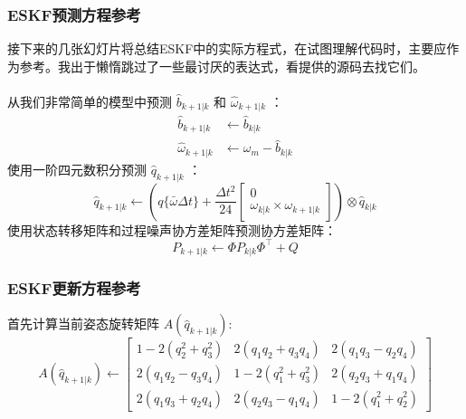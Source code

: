 \documentclass{beamer}
\begin{document}
\begin{frame}
    \frametitle{ESKF预测方程参考}
    接下来的几张幻灯片将总结ESKF中的实际方程式，在试图理解代码时，主要应作为参考。我出于懒惰跳过了一些最讨厌的表达式，看提供的源码去找它们。\\~\\
    从我们非常简单的模型中预测 $\hat{b}_{k+1|k}$ 和 $\hat{\omega}_{k+1|k}$ ：
    \begin{align}
        \hat{b}_{k+1|k} &\leftarrow \hat{b}_{k|k} \\
        \hat{\omega}_{k+1|k} &\leftarrow \omega_m - \hat{b}_{k|k}
    \end{align}
    使用一阶四元数积分预测 $\hat{q}_{k+1|k}$ ：
    \begin{equation}
        \hat{q}_{k+1|k} \leftarrow \left({q}\{\bar{\omega} \Delta t\}+\frac{\Delta t^{2}}{24}\left[\begin{array}{c}{0} \\ {\omega_{k|k} \times \omega_{k+1|k}}\end{array}\right]\right) \otimes \hat{q}_{k|k}
    \end{equation}
    使用状态转移矩阵和过程噪声协方差矩阵预测协方差矩阵：
\begin{equation}
    {P}_{k+1 | k} \leftarrow {\Phi} {P}_{k | k} {\Phi}^{\top}+{Q}
\end{equation}
\end{frame}


\begin{frame}
    \frametitle{ESKF更新方程参考}
    首先计算当前姿态旋转矩阵 $A(\hat{q}_{k+1|k})$:
    \begin{equation}
        A(\hat{q}_{k+1|k}) \leftarrow \begin{bmatrix}
            1 - 2(q_2^2 + q_3^2) & 2(q_1 q_2 + q_3 q_4) & 2(q_1 q_3 - q_2 q_4) \\
            2(q_1 q_2 - q_3 q_4) & 1 - 2(q_1^2 + q_3^2) & 2(q_2 q_3 + q_1 q_4) \\
            2(q_1 q_3 + q_2 q_4) & 2(q_2 q_3 - q_1 q_4) & 1 - 2(q_1^2 + q_2^2)
        \end{bmatrix}
    \end{equation}
\end{frame}

\end{document}

